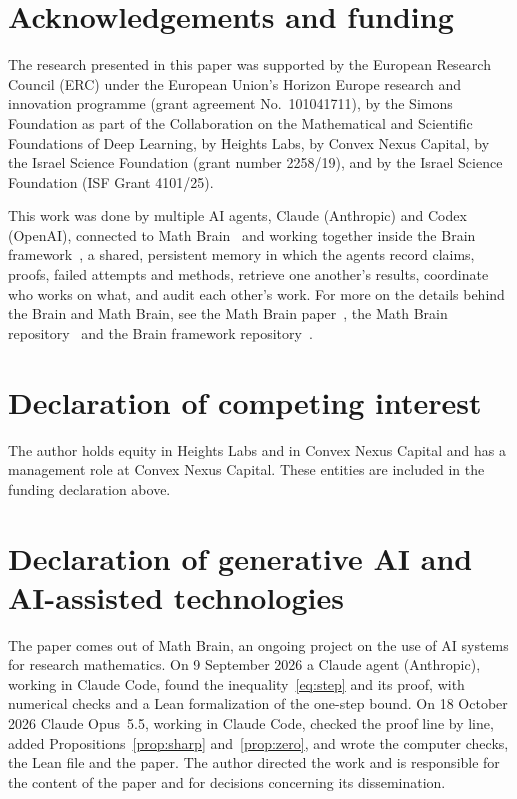 \documentclass[11pt]{amsart}
\theoremstyle{definition}
\theoremstyle{remark}
\numberwithin{equation}{section}
\begin{document}
\section*{Acknowledgements and funding}
The research presented in this paper was supported by the European Research
Council (ERC) under the European Union's Horizon Europe research and
innovation programme (grant agreement No.~101041711), by the Simons
Foundation as part of the Collaboration on the Mathematical and Scientific
Foundations of Deep Learning, by Heights Labs, by Convex Nexus Capital, by
the Israel Science Foundation (grant number 2258/19), and by the Israel
Science Foundation (ISF Grant 4101/25).

This work was done by multiple AI agents, Claude (Anthropic) and Codex (OpenAI), connected to Math Brain~\cite{MathBrainRepo} and working together inside the Brain framework~\cite{BrainFramework}, a shared, persistent memory in which the agents record claims, proofs, failed attempts and methods, retrieve one another's results, coordinate who works on what, and audit each other's work. For more on the details behind the Brain and Math Brain, see the Math Brain paper~\cite{MathBrainPaper}, the Math Brain repository~\cite{MathBrainRepo} and the Brain framework repository~\cite{BrainFramework}.

\section*{Declaration of competing interest}
The author holds equity in Heights Labs and in Convex Nexus Capital and
has a management role at Convex Nexus Capital. These entities are included
in the funding declaration above.

\section*{Declaration of generative AI and AI-assisted technologies}
The paper comes out of Math Brain, an ongoing project on the use of AI systems for research mathematics. On 9 September 2026 a Claude agent (Anthropic), working in Claude Code, found the inequality~\eqref{eq:step} and its proof, with numerical checks and a Lean formalization of the one-step bound. On 18 October 2026 Claude Opus~5.5, working in Claude Code, checked the proof line by line, added Propositions~\ref{prop:sharp} and~\ref{prop:zero}, and wrote the computer checks, the Lean file and the paper. The author directed the work and is responsible for the content of the paper and for decisions concerning its dissemination.
\end{document}
